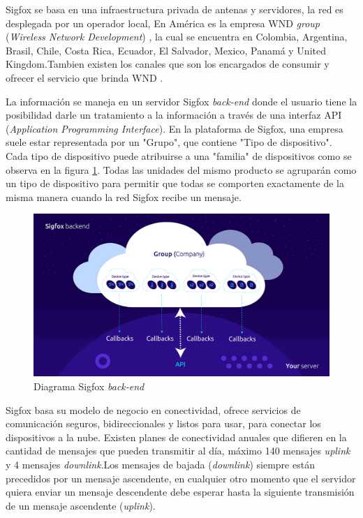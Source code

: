 Sigfox se basa en una infraestructura privada de antenas y servidores, la red es desplegada por un operador local, En América es la empresa WND \textit{group } (\textit{Wireless Network Development}) , la cual se encuentra en Colombia, Argentina, Brasil, Chile, Costa Rica, Ecuador, El Salvador, Mexico, Panamá y United Kingdom.Tambien existen los canales que son los encargados de consumir y ofrecer el servicio que brinda WND \cite{SigfoxCoverage}. 

La información se maneja en un servidor Sigfox  \textit{back-end} donde el usuario tiene la posibilidad darle un tratamiento a la información a través de una interfaz API (\textit{Application Programming Interface}). En la plataforma de Sigfox, una empresa suele estar representada por un "Grupo", que contiene "Tipo de dispositivo". Cada tipo de dispositivo puede atribuirse a una "familia" de dispositivos como se observa en la figura \ref{fig:backendSigfox}. Todas las unidades del mismo producto se agruparán como un tipo de dispositivo para permitir que todas se comporten exactamente de la misma manera cuando la red Sigfox recibe un mensaje. 
\begin{figure}[h]
	\centering
	\includegraphics[scale=.35]{./Figures/backendSigfox.jpg}
	\caption{Diagrama Sigfox \textit{back-end} \protect\footnotemark}
	\label{fig:backendSigfox}
\end{figure}

Sigfox basa su modelo de negocio en conectividad, ofrece servicios de comunicación seguros, bidireccionales y listos para usar, para conectar los dispositivos a la nube. Existen planes de conectividad anuales que difieren en la cantidad de mensajes que pueden transmitir al día, máximo 140 mensajes \textit{uplink} y 4 mensajes \textit{downlink}.Los mensajes de bajada (\textit{downlink}) siempre están precedidos por un mensaje ascendente, en cualquier otro momento que el servidor quiera enviar un mensaje descendente debe esperar hasta la siguiente transmisión de un mensaje ascendente (\textit{uplink}).

